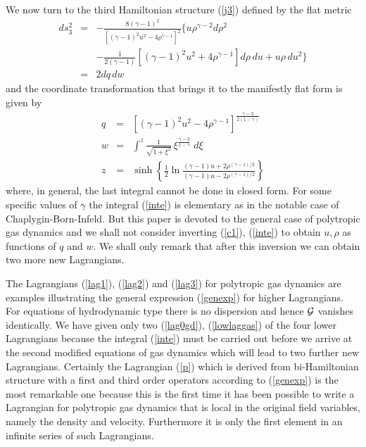 \documentclass[a4paper,12pt]{article}
\begin{document}
We now turn to the third Hamiltonian structure (\ref{j3}) defined
by the flat metric
\begin{eqnarray}
d s_3^2 & = & - \frac{8 (\gamma-1)^2 }{[(\gamma-1)^2 u^{2} -4 \rho
^{\gamma -1}]^{2}}
\Big\{ u \rho^{\gamma-2} d \rho ^{2}  \nonumber \\
 && -  \frac{1}{2 (\gamma -1) } \left[ (\gamma-1)^2 u^{2}+  4 \rho
^{\gamma -1} \right]  d \rho \, d u + u \rho \, du^{2}
\Big\}\\
&=& 2 d q \, d w \nonumber
\end{eqnarray}
and the coordinate transformation that brings it to the manifestly
flat form is given by
\begin{eqnarray}
q & = & \left[ (\gamma-1)^2 u^2 - 4 \rho^{\gamma
-1} \right]^{\frac{\gamma -3}{2(1-\gamma)}}   \label{c1} \\
w&=& \int^z  \frac{1}{\sqrt{1+\xi^2} } \, \xi^{\frac{\gamma
-3}{1-\gamma}} \;
d \xi  \label{inte} \\
z&=& \sinh \left\{ \frac{1}{2} \ln \frac{ (\gamma -1) u + 2
\rho^{(\gamma-1)/2} }{  (\gamma -1) u - 2 \rho^{(\gamma-1)/2}}
\right\} \nonumber
\end{eqnarray}
where, in general, the last integral cannot be done in closed
form. For some specific values of $\gamma$ the integral
(\ref{inte}) is elementary as in the notable case of
Chaplygin-Born-Infeld. But this paper is devoted to the general
case of polytropic gas dynamics and we shall not consider
inverting (\ref{c1}), (\ref{inte}) to obtain $u, \rho$ as
functions of $q$ and $w$. We shall only remark that after this
inversion we can obtain two more new Lagrangians.

The Lagrangians (\ref{lag1}), (\ref{lag2}) and (\ref{lag3}) for
polytropic gas dynamics are examples illustrating the general
expression (\ref{genexp}) for higher Lagrangians. For equations of
hydrodynamic type there is no dispersion and hence ${\cal G}$
vanishes identically. We have given only two (\ref{lag0gd}),
(\ref{lowlaggas}) of the four lower Lagrangians because the
integral (\ref{inte}) must be carried out before we arrive at the
second modified equations of gas dynamics which will lead to two
further new Lagrangians. Certainly the Lagrangian (\ref{p}) which
is derived from bi-Hamiltonian structure with a first and third
order operators according to (\ref{genexp}) is the most remarkable
one because this is the first time it has been possible to write a
Lagrangian for polytropic gas dynamics that is local in the
original field variables, namely the density and velocity.
Furthermore it is only the first element in an infinite series of
such Lagrangians.
\end{document}
